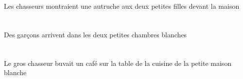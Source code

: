 \begin{exe}
\DEFSgOblP{}   \maisonDSgOblP{}   \DEVANTP{}   \DEFPlErgP{}   \chasseurCPlErgP{}    \DEFDuDatP{}   \petitCDuP{}   \filleCDuDatP{}   \INDSgAbsP{}   \autrucheBSgAbsP{}  \montrerVdPstBSgP{}\\
\DEFSgOblG{}   \maisonDSgOblG{}   \DEVANTG{}   \DEFPlErgG{}   \chasseurCPlErgG{}    \DEFDuDatG{}   \petitCDuG{}   \filleCDuDatG{}   \INDSgAbsG{}   \autrucheBSgAbsG{}  \montrerVdPstBSgG{}\\
Les chasseurs montraient une autruche aux deux petites filles devant la maison
\ex\glll
\INDPlAbs{}   \garconDPlAbs{}    \DEFDuObl{}   \petitBDu{}   \blancBDu{}   \chambreBDuObl{}   \DANS{}  \arriverViPrsDPl{}\\
\INDPlAbsP{}   \garconDPlAbsP{}    \DEFDuOblP{}   \petitBDuP{}   \blancBDuP{}   \chambreBDuOblP{}   \DANSP{}  \arriverViPrsDPlP{}\\
\INDPlAbsG{}   \garconDPlAbsG{}    \DEFDuOblG{}   \petitBDuG{}   \blancBDuG{}   \chambreBDuOblG{}   \DANSG{}  \arriverViPrsDPlG{}\\
Des garçons arrivent dans les deux petites chambres blanches
\ex\glll
\DEFSgObl{}    \DEFSgObl{}    \DEFSgObl{}   \petitDSg{}   \blancDSg{}   \maisonDSgObl{}   \DE{}   \cuisineDSgObl{}   \DE{}   \tableDSgObl{}   \SUR{}   \DEFSgErg{}   \grosCSg{}   \chasseurCSgErg{}   \INDSgAbs{}   \cafeCSgAbs{}  \boireVtPstCSg{}\\
\DEFSgOblP{}    \DEFSgOblP{}    \DEFSgOblP{}   \petitDSgP{}   \blancDSgP{}   \maisonDSgOblP{}   \DEP{}   \cuisineDSgOblP{}   \DEP{}   \tableDSgOblP{}   \SURP{}   \DEFSgErgP{}   \grosCSgP{}   \chasseurCSgErgP{}   \INDSgAbsP{}   \cafeCSgAbsP{}  \boireVtPstCSgP{}\\
\DEFSgOblG{}    \DEFSgOblG{}    \DEFSgOblG{}   \petitDSgG{}   \blancDSgG{}   \maisonDSgOblG{}   \DEG{}   \cuisineDSgOblG{}   \DEG{}   \tableDSgOblG{}   \SURG{}   \DEFSgErgG{}   \grosCSgG{}   \chasseurCSgErgG{}   \INDSgAbsG{}   \cafeCSgAbsG{}  \boireVtPstCSgG{}\\
Le gros chasseur buvait un café sur la table de la cuisine de la petite maison blanche
\ex\glll
\INDSgAbs{}   \petitBSg{}   \sourisBSgAbs{}    \DEFSgObl{}    \DEFSgObl{}   \grosDSg{}   \chatDSgObl{}   \DE{}   \maisonDSgObl{}   \DANS{}  \entrerViPrsBSg{}\\
\INDSgAbsP{}   \petitBSgP{}   \sourisBSgAbsP{}    \DEFSgOblP{}    \DEFSgOblP{}   \grosDSgP{}   \chatDSgOblP{}   \DEP{}   \maisonDSgOblP{}   \DANSP{}  \entrerViPrsBSgP{}\\
\INDSgAbsG{}   \petitBSgG{}   \sourisBSgAbsG{}    \DEFSgOblG{}    \DEFSgOblG{}   \grosDSgG{}   \chatDSgOblG{}   \DEG{}   \maisonDSgOblG{}   \DANSG{}  \entrerViPrsBSgG{}\\

\end{exe}
